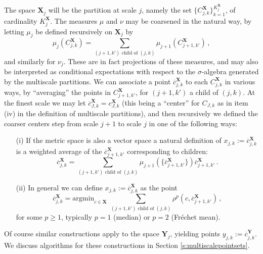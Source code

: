 \documentclass[twoside,11pt]{article}
\newcommand{\Xsp}{{\mathbf{X}}}
\newcommand{\Ysp}{{\mathbf{Y}}}
\begin{document}
The space ${\Xsp}_j$ will be the partition at scale $j$, namely the set
$\{C^{{\Xsp}}_{j,k}\}_{k=1}^{K^{{\Xsp}}_j}$, of cardinality $K^{{\Xsp}}_j$.
The measures $\mu$ and $\nu$ may be coarsened in the natural way, by letting
$\mu_j$ be defined recursively on ${\Xsp}_j$ by 
\begin{equation}
 \mu_j( C_{j,k}^{{\Xsp}} )= \sum_{(j+1,k')\text{ child of } (j,k)} \mu_{j+1}( C_{j+1,k'}^{{\Xsp}} )\,,
\label{e:muj}
\end{equation}
and similarly for $\nu_j$.
These are in fact projections of these measures, and may also be interpreted as
conditional expectations with respect to the $\sigma$-algebra generated by the
multiscale partitions.  We can associate a point $\overline c_{j,k}^{{\Xsp}}$
to each $C_{j,k}^{{\Xsp}}$ in various ways, by ``averaging'' the points in
$C_{j+1,k'}^{{\Xsp}}$, for $(j+1,k')$ a child of $(j,k)$. At the finest scale
we may let $\overline{c}^{{\Xsp}}_{J,k}={c}^{{\Xsp}}_{J,k}$ (this being a
``center'' for $C_{J,k}$ as in item (iv) in the definition of multiscale
partitions), and then recursively we defined the coarser centers step from
scale $j+1$ to scale $j$ in one of the following ways: 
\begin{itemize}
\item[(i)] If the metric space is also a vector space a natural definition of
$x_{j,k}:=\overline c_{j,k}^{{\Xsp}}$ is a weighted average of the $\overline
c_{j+1,k'}^{{\Xsp}}$ corresponding to children: 
$$
\overline{c}^{{\Xsp}}_{j,k} = 
 \sum_{(j+1,k')\text{ child of } (j,k)} \mu_{j+1}(\{\overline c_{j+1,k'}^{{\Xsp}}\}) \overline c_{j+1,k'}^{{\Xsp}}\,.
$$
\item[(ii)] In general we can define $x_{j,k}:=\overline c_{j,k}^{{\Xsp}}$ as the point
$$
\overline{c}^{{\Xsp}}_{j,k}=\mathrm{argmin}_{c \in{\Xsp}}\,\,
\sum_{(j+1,k')\text{ child of } (j,k) } \rho^p( c, \overline c_{j+1,k'}^{{\Xsp}} ) \,,
  $$
for some $p \geq 1$, typically $p=1$ (median) or $p=2$ (Fr\'echet mean).
  

\end{itemize} 
Of course similar constructions apply to the space ${\Ysp}_j$, yielding points
$y_{j,k}:=\overline c_{j,k}^{{\Ysp}}$.
We discuss algorithms for these constructions in Section \ref{s:multiscalepointsets}.
\end{document}
